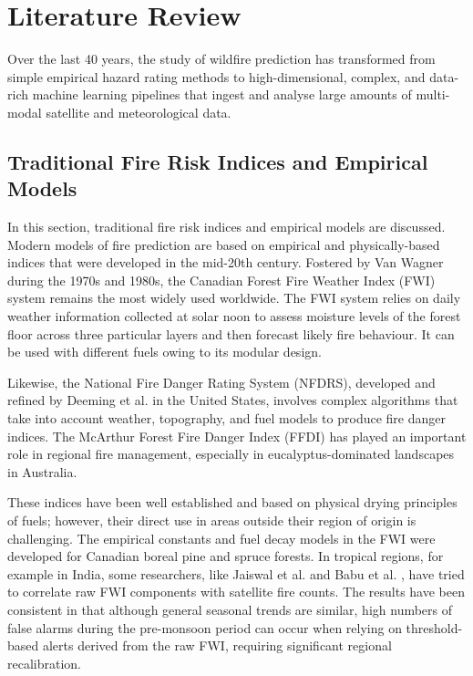 \documentclass[journal, 10pt, twocolumn]{IEEEtran}
\begin{document}
\section{Literature Review}

Over the last 40 years, the study of wildfire prediction has transformed from simple empirical hazard rating methods to high-dimensional, complex, and data-rich machine learning pipelines that ingest and analyse large amounts of multi-modal satellite and meteorological data.

\subsection{Traditional Fire Risk Indices and Empirical Models}
In this section, traditional fire risk indices and empirical models are discussed. Modern models of fire prediction are based on empirical and physically-based indices that were developed in the mid-20th century. Fostered by Van Wagner during the 1970s and 1980s, the Canadian Forest Fire Weather Index (FWI) system remains the most widely used worldwide. The FWI system relies on daily weather information collected at solar noon to assess moisture levels of the forest floor across three particular layers and then forecast likely fire behaviour. It can be used with different fuels owing to its modular design.

Likewise, the National Fire Danger Rating System (NFDRS), developed and refined by Deeming et al. \cite{b20} in the United States, involves complex algorithms that take into account weather, topography, and fuel models to produce fire danger indices. The McArthur Forest Fire Danger Index (FFDI) \cite{b21} has played an important role in regional fire management, especially in eucalyptus-dominated landscapes in Australia.

These indices have been well established and based on physical drying principles of fuels; however, their direct use in areas outside their region of origin is challenging. The empirical constants and fuel decay models in the FWI were developed for Canadian boreal pine and spruce forests. In tropical regions, for example in India, some researchers, like Jaiswal et al. \cite{b22} and Babu et al. \cite{b23}, have tried to correlate raw FWI components with satellite fire counts. The results have been consistent in that although general seasonal trends are similar, high numbers of false alarms during the pre-monsoon period can occur when relying on threshold-based alerts derived from the raw FWI, requiring significant regional recalibration.
\end{document}
